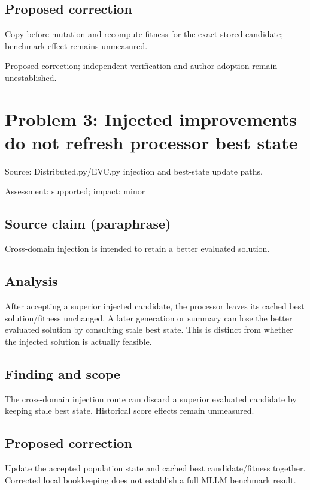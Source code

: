 \documentclass[11pt]{article}
\begin{document}
\subsection*{Proposed correction}

Copy before mutation and recompute fitness for the exact stored candidate; benchmark effect remains unmeasured.

Proposed correction; independent verification and author adoption remain unestablished.

\section*{Problem 3: Injected improvements do not refresh processor best state}

Source: Distributed.py/EVC.py injection and best-state update paths.

Assessment: supported; impact: minor

\subsection*{Source claim (paraphrase)}

Cross-domain injection is intended to retain a better evaluated solution.

\subsection*{Analysis}

After accepting a superior injected candidate, the processor leaves its cached best solution/fitness unchanged. A later generation or summary can lose the better evaluated solution by consulting stale best state. This is distinct from whether the injected solution is actually feasible.

\subsection*{Finding and scope}

The cross-domain injection route can discard a superior evaluated candidate by keeping stale best state. Historical score effects remain unmeasured.

\subsection*{Proposed correction}

Update the accepted population state and cached best candidate/fitness together. Corrected local bookkeeping does not establish a full MLLM benchmark result.
\end{document}
